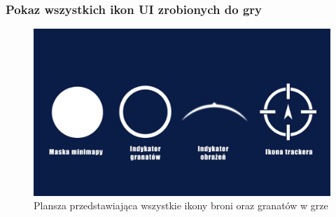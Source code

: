 \subsubsection{Pokaz wszystkich ikon UI zrobionych do gry}

\begin{figure}[h]
    \centering
    \includegraphics[scale=0.2]{Images/Pokazaniegranatow.jpg}
    \caption{Plansza przedstawiająca wszystkie ikony broni oraz granatów w grze}
    \label{fig:visBuglist}
\end{figure}
\newpage